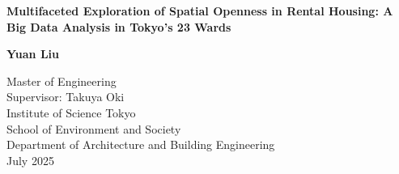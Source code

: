 \begin{titlepage}
    \begin{center}
        \vspace*{1cm}
        \Huge
        \begin{center}
            \LARGE
            \textbf{Multifaceted Exploration of Spatial Openness in Rental Housing: A Big Data Analysis in Tokyo's 23 Wards}
        \end{center}

 
        \vspace{1.5cm}
 
        

 
        \vfill
 
        
        \textbf{Yuan Liu}
 
        \vspace{0.8cm}
 

 
        \Large
        Master of Engineering\\
        Supervisor: Takuya Oki\\
        Institute of Science Tokyo\\
        School of Environment and Society\\
        Department of Architecture and Building Engineering\\
        July 2025
 
    \end{center}
\end{titlepage}